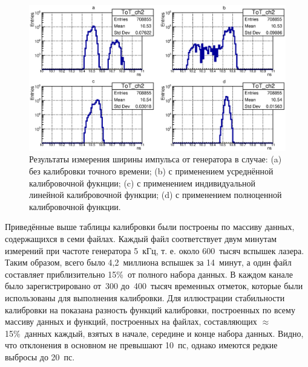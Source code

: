 \begin{figure}[H]
\centering
\includegraphics[width=1.0\textwidth]{pictures/20_ToT_ch2.eps}
\caption{Результаты измерения ширины импульса от генератора в случае: (a) без калибровки точного времени; (b) с применением усреднённой калибровочной фукнции; (c) с применением индивидуальной линейной калибровочной функции; (d) с применением полноценной калибровочной функции.}
\label{fig:FourToT}
\end{figure}

Приведённые выше таблицы калибровки были построены по массиву данных, содержащихся в семи файлах. Каждый файл соответствует двум минутам измерений при частоте генератора 5~кГц, т. е. около 600~тысяч вспышек лазера. Таким образом, всего было 4,2~миллиона вспышек за 14~минут, а один файл составляет приблизительно 15\%~от полного набора данных. В каждом канале было зарегистрировано от~300 до~400~тысяч временных отметок, которые были использованы для выполнения калибровки. Для иллюстрации стабильности калибровки на  показана разность функций калибровки, построенных по всему массиву данных и функций, построенных на файлах, составляющих $ \approx $15\%~данных каждый, взятых в начале, середине и конце набора данных. Видно, что отклонения в основном не превышают 10~пс, однако имеются редкие выбросы до 20~пс.

